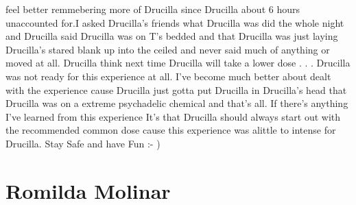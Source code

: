 \documentclass[12pt]{book}
\begin{document}
feel better remmebering more of Drucilla since Drucilla about 6 hours unaccounted for.I asked Drucilla's friends what Drucilla was did the whole night and Drucilla said Drucilla was on T's bedded and that Drucilla was just laying Drucilla's stared blank up into the ceiled and never said much of anything or moved at all. Drucilla think next time Drucilla will take a lower dose . . .  Drucilla was not ready for this experience at all. I've become much better about dealt with the experience cause Drucilla just gotta put Drucilla in Drucilla's head that Drucilla was on a extreme psychadelic chemical and that's all. If there's anything I've learned from this experience It's that Drucilla should always start out with the recommended common dose cause this experience was alittle to intense for Drucilla. Stay Safe and have Fun :- )



\chapter{Romilda Molinar}
\end{document}
